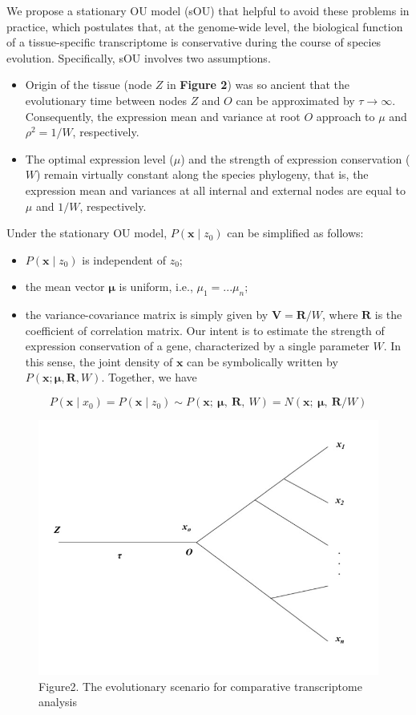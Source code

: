 \documentclass[]{book}
\providecommand{\tightlist}{%
  \setlength{\itemsep}{0pt}\setlength{\parskip}{0pt}}
\begin{document}
We propose a stationary OU model (sOU) that helpful to avoid these problems in practice, which postulates that, at the genome-wide level, the biological function of a tissue-specific transcriptome is conservative during the course of species evolution. Specifically, sOU involves two assumptions.

\begin{itemize}
\tightlist
\item
  Origin of the tissue (node \(Z\) in \textbf{Figure 2}) was so ancient that the evolutionary time between nodes \(Z\) and \(O\) can be approximated by \(\tau \to \infty\). Consequently, the expression mean and variance at root \(O\) approach to \(\mu\) and \(\rho^{2} = 1/W\), respectively.
\item
  The optimal expression level (\(\mu\)) and the strength of expression conservation (\(W\)) remain virtually constant along the species phylogeny, that is, the expression mean and variances at all internal and external nodes are equal to \(\mu\) and \(1/W\), respectively.
\end{itemize}

Under the stationary OU model, \(P\left(\boldsymbol{x}\mid z_0\right)\) can be simplified as follows:

\begin{itemize}
\tightlist
\item
  \(P\left(\boldsymbol{x}\mid z_0\right)\) is independent of \(z_0\);
\item
  the mean vector \(\boldsymbol{\mu}\) is uniform, i.e., \(\mu_1=...\mu_n\);
\item
  the variance-covariance matrix is simply given by \(\boldsymbol{V}=\boldsymbol{R}/W\), where \(\boldsymbol{R}\) is the coefficient of correlation matrix. Our intent is to estimate the strength of expression conservation of a gene, characterized by a single parameter \(W\). In this sense, the joint density of \(\boldsymbol{x}\) can be symbolically written by \(P\left(\boldsymbol{x};\boldsymbol{\mu},\boldsymbol{R},W\right)\). Together, we have
\end{itemize}

\[P\left(\boldsymbol{x}\mid x_0\right)=P\left(\boldsymbol{x}\mid z_0\right)\sim P\left(\boldsymbol{x};\  \boldsymbol{\mu},\  \boldsymbol{R},\  W\right)=N\left(\boldsymbol{x};\  \boldsymbol{\mu},\  \boldsymbol{R}/W\right)\tag{3.3}\]

\begin{figure}
\includegraphics[width=0.5\linewidth]{Figure2} \caption{Figure2. The evolutionary scenario for comparative transcriptome analysis}\label{fig:pressure}
\end{figure}
\end{document}
